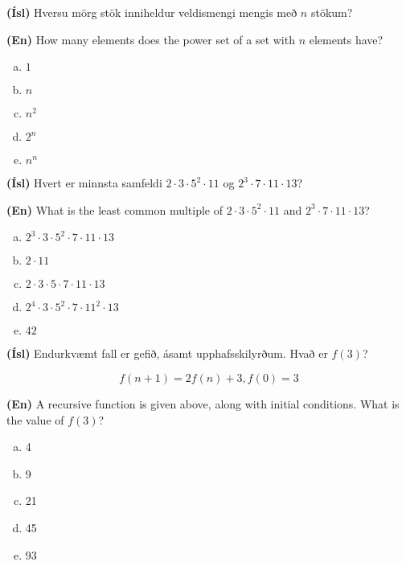 \documentclass[addpoints]{exam}
\begin{document}
\begin{questions}
\question[3] 

\textbf{(Ísl)} Hversu mörg stök inniheldur veldismengi mengis með $n$ stökum?

\textbf{(En)} How many elements does the power set of a set with $n$ elements have?

\begin{enumerate}[a)]    
    \item $1$
    \item $n$
    \item $n^2$
    \item $2^n$ %
    \item $n^n$
\end{enumerate}

\newpage

\question[3] 

\textbf{(Ísl)} Hvert er minnsta samfeldi $2\cdot 3 \cdot 5^2 \cdot 11$ og $2^3 \cdot 7 \cdot 11 \cdot 13$?

\textbf{(En)} What is the least common multiple of $2\cdot 3 \cdot 5^2 \cdot 11$ and $2^3 \cdot 7 \cdot 11 \cdot 13$?

\begin{enumerate}[a)]
    \item $2^3\cdot 3 \cdot 5^2 \cdot 7 \cdot 11 \cdot 13$
    \item $2\cdot 11$
    \item $2\cdot 3 \cdot 5 \cdot 7 \cdot 11 \cdot 13$
    \item $2^4\cdot 3 \cdot 5^2 \cdot 7 \cdot 11^2 \cdot 13$
    \item $42$
\end{enumerate}

\question[3]

\textbf{(Ísl)} Endurkvæmt fall er gefið, ásamt upphafsskilyrðum. Hvað er $f(3)$?

\[
    f(n+1) = 2f(n) + 3, f(0) = 3
\]

\textbf{(En)} A recursive function is given above, along with initial conditions. What is the value of $f(3)$?

\begin{enumerate}[a)]
    \item 4
    \item 9
    \item 21
    \item 45
    \item 93
\end{enumerate}

\question[3] 


\end{questions}
\end{document}

